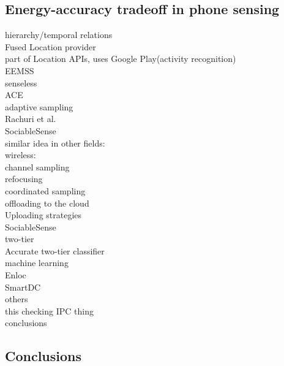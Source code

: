 \subsection{Energy-accuracy tradeoff in phone sensing}
hierarchy/temporal relations\\
	Fused Location provider\cite{android:locationapi}\\
		part of Location APIs, uses Google Play(activity recognition)\\
	EEMSS \cite{wang:eemss}\\
	senseless \cite{benabdesslem:senseless}\\
	ACE \cite{nath:ace}\\

adaptive sampling\\
	Rachuri et al. \cite{rachuri:dynamicsensing}\\
	SociableSense \cite{rachuri:socialsense} \\
	similar idea in other fields:\\
		wireless:\\
			channel sampling \cite{deshpande:channeling}\\
			refocusing \cite{deshpande:refocusing}\\
			coordinated sampling \cite{deshpande:coordinated}\\

offloading to the cloud\\
	Uploading strategies \cite{musolesi:offloading}\\
	SociableSense \cite{rachuri:socialsense} \\
	
two-tier\\
	Accurate two-tier classifier \cite{srinivasan:twotier}\\

machine learning\\
	Enloc \cite{constandache:enloc}\\
	SmartDC \cite{chon:smartdc}\\

others\\
	this checking IPC thing\\

conclusions

\subsection{Conclusions}
